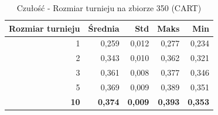 \begin{table}[htbp]
\centering
\small
\setlength{\tabcolsep}{6pt}
\renewcommand{\arraystretch}{1.2}
\caption{Czułość - Rozmiar turnieju na zbiorze 350 (CART)}
\label{tab:CART_tournament_size_350_recall}
\begin{tabular}{r|r|r|r|r}
\toprule
Rozmiar turnieju & Średnia & Std & Maks & Min \\
\hline
1 & 0,259 & 0,012 & 0,277 & 0,234 \\
2 & 0,343 & 0,010 & 0,362 & 0,321 \\
3 & 0,361 & 0,008 & 0,377 & 0,346 \\
5 & 0,369 & 0,009 & 0,389 & 0,351 \\
\textbf{10} & \textbf{0,374} & \textbf{0,009} & \textbf{0,393} & \textbf{0,353} \\
\bottomrule
\end{tabular}
\end{table}